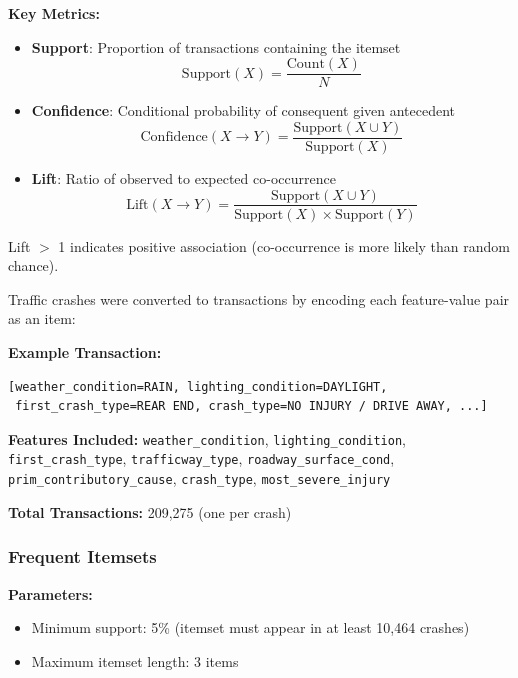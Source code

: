 \documentclass[stu,12pt,floatsintext]{apa7}
\begin{document}
\textbf{Key Metrics:}
\begin{itemize}
    \item \textbf{Support}: Proportion of transactions containing the itemset
    \begin{equation}
    \mathrm{Support}(X) = \frac{\mathrm{Count}(X)}{N}
    \end{equation}

    \item \textbf{Confidence}: Conditional probability of consequent given antecedent
    \begin{equation}
    \mathrm{Confidence}(X \rightarrow Y) = \frac{\mathrm{Support}(X \cup Y)}{\mathrm{Support}(X)}
    \end{equation}

    \item \textbf{Lift}: Ratio of observed to expected co-occurrence
    \begin{equation}
    \mathrm{Lift}(X \rightarrow Y) = \frac{\mathrm{Support}(X \cup Y)}{\mathrm{Support}(X) \times \mathrm{Support}(Y)}
    \end{equation}
\end{itemize}

Lift $>$ 1 indicates positive association (co-occurrence is more likely than random chance).

Traffic crashes were converted to transactions by encoding each feature-value pair as an item:

\textbf{Example Transaction:}
\begin{verbatim}
[weather_condition=RAIN, lighting_condition=DAYLIGHT,
 first_crash_type=REAR END, crash_type=NO INJURY / DRIVE AWAY, ...]
\end{verbatim}

\textbf{Features Included:} \texttt{weather\_condition}, \texttt{lighting\_condition}, \texttt{first\_crash\_type}, 
\texttt{trafficway\_type}, \texttt{roadway\_surface\_cond}, \texttt{prim\_contributory\_cause}, \texttt{crash\_type}, 
\texttt{most\_severe\_injury}

\textbf{Total Transactions:} 209,275 (one per crash)

\subsubsection{Frequent Itemsets}

\textbf{Parameters:}
\begin{itemize}
    \item Minimum support: 5\% (itemset must appear in at least 10,464 crashes)
    \item Maximum itemset length: 3 items
\end{itemize}
\end{document}
